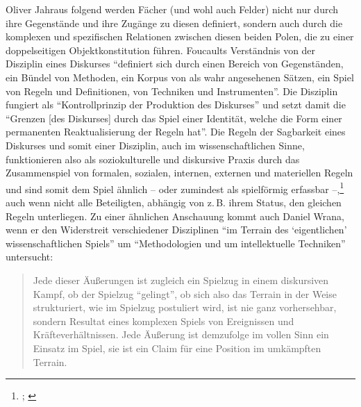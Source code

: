 \documentclass{scrartcl}
\begin{document}
Oliver Jahraus folgend werden Fächer (und wohl auch Felder) nicht nur durch ihre Gegenstände und ihre Zugänge zu diesen definiert, sondern auch durch die komplexen und spezifischen Relationen zwischen diesen beiden Polen, die zu einer doppelseitigen Objektkonstitution führen.\autocite[Vgl.][S.~6]{jahraus_literaturtheorie_2004}
Foucaults Verständnis von der Disziplin eines Diskurses \enquote{definiert sich durch einen Bereich von Gegenständen, ein Bündel von Methoden, ein Korpus von als wahr angesehenen Sätzen, ein Spiel von Regeln und Definitionen, von Techniken und Instrumenten}.\autocite[][S.~22]{foucault_ordnung_1993}
Die Disziplin fungiert als \enquote{Kontrollprinzip der Produktion des Diskurses} und setzt damit die \enquote{Grenzen [des Diskurses] durch das Spiel einer Identität, welche die Form einer permanenten Reaktualisierung der Regeln hat}.\autocite[][S.~25]{foucault_ordnung_1993}
Die Regeln der Sagbarkeit eines Diskurses und somit einer Disziplin, auch im wissenschaftlichen Sinne, funktionieren also als soziokulturelle und diskursive Praxis durch das Zusammenspiel von formalen, sozialen, internen, externen und materiellen Regeln und sind somit dem Spiel ähnlich -- oder zumindest als spielförmig erfassbar --,\footnote{\autocite[Vgl.][S.~2--3]{stenros_rule_2024}; \autocite[][S.~24--325]{unterhuber_spielgeschichten_nodate}} auch wenn nicht alle Beteiligten, abhängig von z.\,B. ihrem Status, den gleichen Regeln unterliegen.
Zu einer ähnlichen Anschauung kommt auch Daniel Wrana, wenn er den Widerstreit verschiedener Disziplinen \enquote{im Terrain des \enquote{eigentlichen} wissenschaftlichen Spiels} um \enquote{Methodologien und um intellektuelle Techniken} untersucht:\autocite[][S.~49]{wrana_inter-disziplinaritat_2017}

\begin{quote}
   Jede dieser Äußerungen ist zugleich ein Spielzug in einem diskursiven Kampf, ob der Spielzug \enquote{gelingt}, ob sich also das Terrain in der Weise strukturiert, wie im Spielzug postuliert wird, ist nie ganz vorhersehbar, sondern Resultat eines komplexen Spiels von Ereignissen und Kräfteverhältnissen.
   Jede Äußerung ist demzufolge im vollen Sinn ein Einsatz im Spiel, sie ist ein Claim für eine Position im umkämpften Terrain.\autocite[][S.~43]{wrana_inter-disziplinaritat_2017}
\end{quote}
\end{document}
